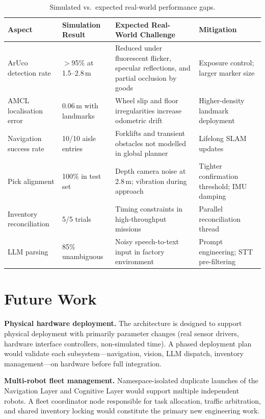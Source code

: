 \documentclass[12pt,a4paper]{report}
\begin{document}
\begin{table}[H]
\centering
\caption{Simulated vs.\ expected real-world performance gaps.}
\label{tab:sim_vs_real}
\begin{tabular}{p{3.5cm} p{4cm} p{4cm} p{2.5cm}}
\toprule
\textbf{Aspect} & \textbf{Simulation Result} & \textbf{Expected Real-World Challenge} & \textbf{Mitigation} \\
\midrule
ArUco detection rate & $>$95\% at 1.5--2.8\,m & Reduced under fluorescent flicker, specular reflections, and partial occlusion by goods & Exposure control; larger marker size \\
\midrule
AMCL localisation error & 0.06\,m with landmarks & Wheel slip and floor irregularities increase odometric drift & Higher-density landmark deployment \\
\midrule
Navigation success rate & 10/10 aisle entries & Forklifts and transient obstacles not modelled in global planner & Lifelong SLAM updates \\
\midrule
Pick alignment & 100\% in test set & Depth camera noise at 2.8\,m; vibration during approach & Tighter confirmation threshold; IMU damping \\
\midrule
Inventory reconciliation & 5/5 trials & Timing constraints in high-throughput missions & Parallel reconciliation thread \\
\midrule
LLM parsing & 85\% unambiguous & Noisy speech-to-text input in factory environment & Prompt engineering; STT pre-filtering \\
\bottomrule
\end{tabular}
\end{table}

\section{Future Work}

\textbf{Physical hardware deployment.} The architecture is designed to support physical deployment with primarily parameter changes (real sensor drivers, hardware interface controllers, non-simulated time). A phased deployment plan would validate each subsystem—navigation, vision, LLM dispatch, inventory management—on hardware before full integration.

\textbf{Multi-robot fleet management.} Namespace-isolated duplicate launches of the Navigation Layer and Cognitive Layer would support multiple independent robots. A fleet coordinator node responsible for task allocation, traffic arbitration, and shared inventory locking would constitute the primary new engineering work.
\end{document}
